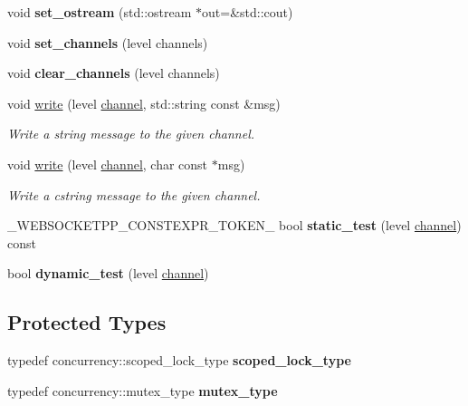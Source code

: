 \begin{DoxyCompactItemize}
\mbox{\label{classwebsocketpp_1_1log_1_1basic_ad35f40223f3a5a1e5650600f00938047}} 
void {\bfseries set\+\_\+ostream} (std\+::ostream $\ast$out=\&std\+::cout)
\item 
\mbox{\label{classwebsocketpp_1_1log_1_1basic_a35e70935ce8b7a30c6eafea45181907a}} 
void {\bfseries set\+\_\+channels} (level channels)
\item 
\mbox{\label{classwebsocketpp_1_1log_1_1basic_a46bedf7f2bca8e28b39d0b6a4816a8d1}} 
void {\bfseries clear\+\_\+channels} (level channels)
\item 
void \mbox{\hyperlink{classwebsocketpp_1_1log_1_1basic_a9f87a8c3e5d8e25e5f014756827a587a}{write}} (level \mbox{\hyperlink{classchannel}{channel}}, std\+::string const \&msg)
\begin{DoxyCompactList}\small\item\em Write a string message to the given channel. \end{DoxyCompactList}\item 
void \mbox{\hyperlink{classwebsocketpp_1_1log_1_1basic_a693e6a522f654fd131a0c6f8d084c921}{write}} (level \mbox{\hyperlink{classchannel}{channel}}, char const $\ast$msg)
\begin{DoxyCompactList}\small\item\em Write a cstring message to the given channel. \end{DoxyCompactList}\item 
\mbox{\label{classwebsocketpp_1_1log_1_1basic_a735d9aa5c0776140c092bc3e5d58341d}} 
\+\_\+\+W\+E\+B\+S\+O\+C\+K\+E\+T\+P\+P\+\_\+\+C\+O\+N\+S\+T\+E\+X\+P\+R\+\_\+\+T\+O\+K\+E\+N\+\_\+ bool {\bfseries static\+\_\+test} (level \mbox{\hyperlink{classchannel}{channel}}) const
\item 
\mbox{\label{classwebsocketpp_1_1log_1_1basic_a8f443b4ff286da803a114897a8f97105}} 
bool {\bfseries dynamic\+\_\+test} (level \mbox{\hyperlink{classchannel}{channel}})
\end{DoxyCompactItemize}
\subsection*{Protected Types}
\begin{DoxyCompactItemize}
\item 
\mbox{\label{classwebsocketpp_1_1log_1_1basic_aa11847dfc30ac1f1c9c5fc599132560f}} 
typedef concurrency\+::scoped\+\_\+lock\+\_\+type {\bfseries scoped\+\_\+lock\+\_\+type}
\item 
\mbox{\label{classwebsocketpp_1_1log_1_1basic_a293124c7129b2c70c8ed33d355d3b355}} 
typedef concurrency\+::mutex\+\_\+type {\bfseries mutex\+\_\+type}
\end{DoxyCompactItemize}

